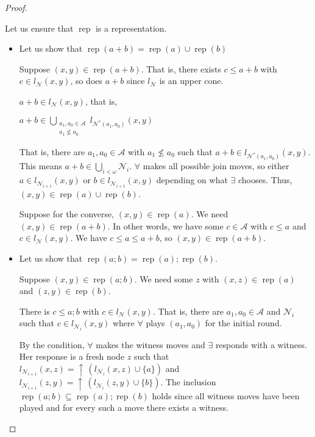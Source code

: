 \documentclass[a4paper]{article}
\theoremstyle{definition}
\theoremstyle{theorem}
\theoremstyle{proposition}
\theoremstyle{lemma}
\theoremstyle{ex}
\theoremstyle{corollary}
\theoremstyle{claim}
\newcommand{\up}[1]{\ensuremath{{\uparrow}\,#1}}
\begin{document}
\begin{proof}
\begin{enumerate}
    Let us ensure that $\operatorname{rep}$ is a representation.

    \begin{itemize}
  \item Let us show that $\operatorname{rep}(a + b) = \operatorname{rep}(a) \cup \operatorname{rep}(b)$

  Suppose $(x, y) \in \operatorname{rep}(a + b)$. That is, there exists $c \leq a + b$ with $c \in l_{\mathcal{N}}(x, y)$, so does $a + b$ since $l_{\mathcal{N}}$ is an upper cone.

  $a + b \in l_{\mathcal{N}}(x, y)$, that is,

\begin{center}
$a + b \in \bigcup \limits_{ \substack{a_1, a_0 \in \mathcal{A} \\ a_1 \not\leq a_0}} l_{\mathcal{N}^{*}(a_1, a_0)}(x,y)$
\end{center}

That is, there are $a_1, a_0 \in \mathcal{A}$ with $a_1 \not\leq a_0$ such that $a + b \in l_{\mathcal{N}^{*}(a_1, a_0)}(x,y)$.
This means $a + b \in \bigcup \limits_{i < \omega} \mathcal{N}_i$.
$\forall$ makes all possible join moves, so either $a \in l_{\mathcal{N}_{i + 1}}(x, y)$ or $b \in l_{\mathcal{N}_{i + 1}}(x, y)$ depending on what $\exists$ chooses.
Thus, $(x, y) \in \operatorname{rep}(a) \cup \operatorname{rep}(b)$.

Suppose for the converse, $(x, y) \in \operatorname{rep}(a)$. We need $(x, y) \in \operatorname{rep}(a + b)$.
In other words, we have some $c \in \mathcal{A}$ with $c \leq a$ and $c \in l_{\mathcal{N}}(x, y)$.
We have $c \leq a \leq a + b$, so $(x, y) \in \operatorname{rep}(a + b)$.

\item Let us show that $\operatorname{rep}(a ; b) = \operatorname{rep}(a) ; \operatorname{rep}(b)$.

Suppose $(x, y) \in \operatorname{rep}(a ; b)$. We need some $z$ with $(x, z) \in \operatorname{rep}(a)$ and $(z, y) \in \operatorname{rep}(b)$.

There is $c \leq a ; b$ with $c \in l_{\mathcal{N}}(x,y)$. That is, there are $a_1, a_0 \in \mathcal{A}$ and $\mathcal{N}_i$ such that $c \in l_{\mathcal{N}_i}(x, y)$ where $\forall$ plays $(a_1, a_0)$ for the initial round.

By the condition, $\forall$ makes the witness moves and $\exists$ responds with a witness. Her response is a fresh node $z$ such that $l_{\mathcal{N}_{i + 1}}(x, z) =  \up{(l_{\mathcal{N}_i}(x, z) \cup \{ a \})}$ and $l_{\mathcal{N}_{i + 1}}(z, y) = \up{(l_{\mathcal{N}_i}(z, y) \cup \{ b\})}$. The inclusion $\operatorname{rep}(a ; b) \subseteq \operatorname{rep}(a) ; \operatorname{rep}(b)$ holds since all witness moves have been played and for every such a move there exists a witness.


\end{itemize}
\end{enumerate}
\end{proof}
\end{document}
